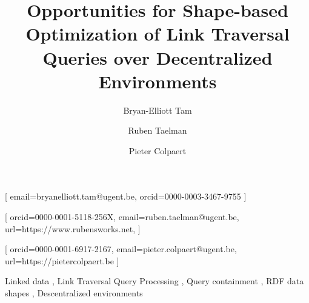\documentclass[
]{ceurart}
\begin{document}


\title{Opportunities for Shape-based Optimization of Link Traversal Queries over Decentralized Environments}


\author[1]{Bryan-Elliott Tam}[%
email=bryanelliott.tam@ugent.be,
orcid=0000-0003-3467-9755
]
\cormark[1]

\author[1]{Ruben Taelman}[%
orcid=0000-0001-5118-256X,
email=ruben.taelman@ugent.be,
url=https://www.rubensworks.net,
]
\author[1]{Pieter Colpaert}[%
orcid=0000-0001-6917-2167,
email=pieter.colpaert@ugent.be,
url=https://pietercolpaert.be
]


\address[1]{IDLab,
Department of Electronics and Information Systems, Ghent University – imec}

\begin{keywords}
  Linked data \sep
  Link Traversal Query Processing \sep
  Query containment \sep
  RDF data shapes \sep
  Descentralized environments
\end{keywords}

\maketitle










\end{document}
